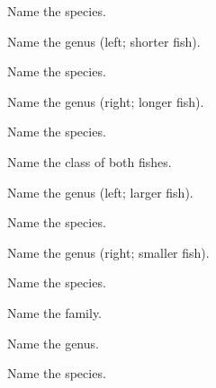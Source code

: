 \documentclass{exam}
\begin{document}
\begin{questions}
{\question Name the species.
\vspace{2\baselineskip}

\question Name the genus (left; shorter fish).
\vspace{0.5\baselineskip}

\question Name the species.
\vspace{0.5\baselineskip}

\question Name the genus (right; longer fish).
\vspace{0.5\baselineskip}

\question Name the species.
\vspace{0.5\baselineskip}

\question Name the class of both fishes.
\vspace{2\baselineskip}

\question Name the genus (left; larger fish).
\vspace{0.5\baselineskip}

\question Name the species.
\vspace{0.5\baselineskip}

\question Name the genus (right; smaller fish).
\vspace{0.5\baselineskip}

\question Name the species.
\vspace{2\baselineskip}

\question Name the family.
\vspace{0.5\baselineskip}

\question Name the genus.
\vspace{0.5\baselineskip}

\question Name the species.
\vspace{2\baselineskip}
%
}%
\end{questions}
\end{document}

